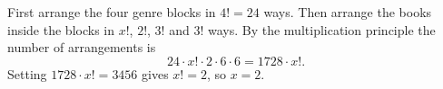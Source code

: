 First arrange the four genre blocks in $4!=24$ ways. Then arrange the books inside the blocks in $x!$, $2!$, $3!$ and $3!$ ways. By the multiplication principle the number of arrangements is
\[24\cdot x!\cdot2\cdot6\cdot6=1728\cdot x! .\]
Setting $1728\cdot x!=3456$ gives $x!=2$, so $x=\boxed{2}$.
